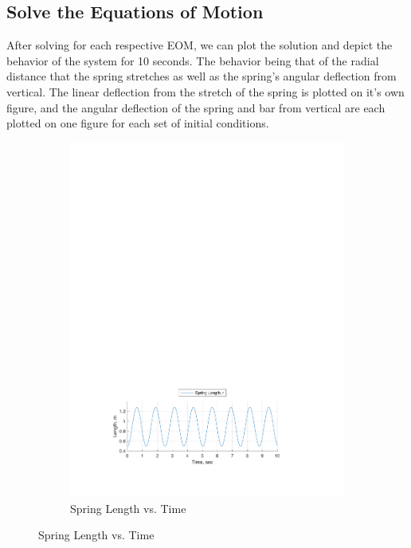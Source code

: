\documentclass[12pt]{report}
\begin{document}
\begin{flushleft}
\section{Solve the Equations of Motion} \label{section:solve}
After solving for each respective EOM, we can plot the solution and depict
the behavior of the system for 10 seconds. The behavior being that of the radial distance
that the spring stretches as well as the spring's angular deflection from vertical. The linear deflection from the stretch of the spring is plotted on it's own figure, and the angular deflection of the spring and bar from vertical are each plotted on one figure
for each set of initial conditions.
\begin{figure}[!htp]
  \caption{Numerical Solution Motion Behavior Plot, ($\theta_o:~0,~\phi_o:~0$)}
  \begin{subfigure}[t]{\textwidth}
  \includegraphics[center]{spring_0-0}
  \caption*{Spring Length vs. Time}
  \label{fig:spring:0:0}
\end{subfigure}
\end{figure}


\end{flushleft}
\end{document}
